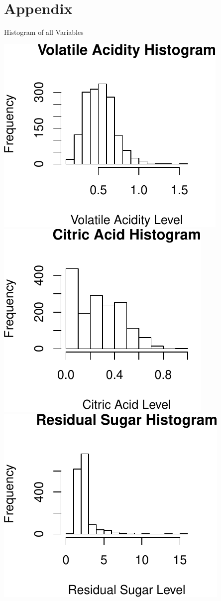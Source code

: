 \documentclass[]{article}
\begin{document}
\section{Appendix}\label{appendix}

Histogram of all Variables

\includegraphics{./Project_files/figure-latex/unnamed-chunk-18-1.pdf}
\includegraphics{./Project_files/figure-latex/unnamed-chunk-18-2.pdf}
\includegraphics{./Project_files/figure-latex/unnamed-chunk-18-3.pdf}
\end{document}
